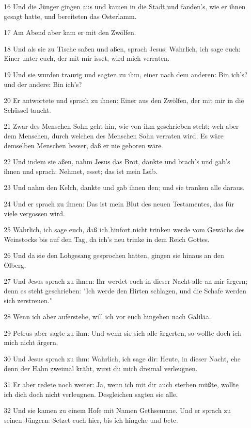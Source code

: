 \par 16 Und die Jünger gingen aus und kamen in die Stadt und fanden's, wie er ihnen gesagt hatte, und bereiteten das Osterlamm.
\par 17 Am Abend aber kam er mit den Zwölfen.
\par 18 Und als sie zu Tische saßen und aßen, sprach Jesus: Wahrlich, ich sage euch: Einer unter euch, der mit mir isset, wird mich verraten.
\par 19 Und sie wurden traurig und sagten zu ihm, einer nach dem anderen: Bin ich's? und der andere: Bin ich's?
\par 20 Er antwortete und sprach zu ihnen: Einer aus den Zwölfen, der mit mir in die Schüssel taucht.
\par 21 Zwar des Menschen Sohn geht hin, wie von ihm geschrieben steht; weh aber dem Menschen, durch welchen des Menschen Sohn verraten wird. Es wäre demselben Menschen besser, daß er nie geboren wäre.
\par 22 Und indem sie aßen, nahm Jesus das Brot, dankte und brach's und gab's ihnen und sprach: Nehmet, esset; das ist mein Leib.
\par 23 Und nahm den Kelch, dankte und gab ihnen den; und sie tranken alle daraus.
\par 24 Und er sprach zu ihnen: Das ist mein Blut des neuen Testamentes, das für viele vergossen wird.
\par 25 Wahrlich, ich sage euch, daß ich hinfort nicht trinken werde vom Gewächs des Weinstocks bis auf den Tag, da ich's neu trinke in dem Reich Gottes.
\par 26 Und da sie den Lobgesang gesprochen hatten, gingen sie hinaus an den Ölberg.
\par 27 Und Jesus sprach zu ihnen: Ihr werdet euch in dieser Nacht alle an mir ärgern; denn es steht geschrieben: "Ich werde den Hirten schlagen, und die Schafe werden sich zerstreuen."
\par 28 Wenn ich aber auferstehe, will ich vor euch hingehen nach Galiläa.
\par 29 Petrus aber sagte zu ihm: Und wenn sie sich alle ärgerten, so wollte doch ich mich nicht ärgern.
\par 30 Und Jesus sprach zu ihm: Wahrlich, ich sage dir: Heute, in dieser Nacht, ehe denn der Hahn zweimal kräht, wirst du mich dreimal verleugnen.
\par 31 Er aber redete noch weiter: Ja, wenn ich mit dir auch sterben müßte, wollte ich dich doch nicht verleugnen. Desgleichen sagten sie alle.
\par 32 Und sie kamen zu einem Hofe mit Namen Gethsemane. Und er sprach zu seinen Jüngern: Setzet euch hier, bis ich hingehe und bete.
